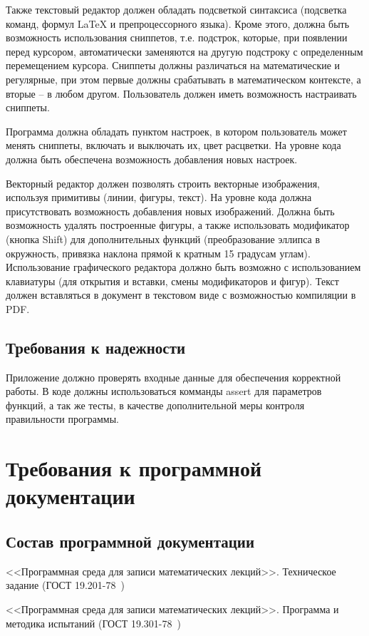 \documentclass[testmethods]{espd}
\begin{document}
Также текстовый редактор должен обладать подсветкой синтаксиса (подсветка команд, формул LaTeX и препроцессорного языка). Кроме этого, должна быть возможность использования сниппетов, т.е. подстрок, которые, при появлении перед курсором, автоматически заменяются на другую подстроку с определенным перемещением курсора. Сниппеты должны различаться на математические и регулярные, при этом первые должны срабатывать в математическом контексте, а вторые -- в любом другом. Пользователь должен иметь возможность настраивать сниппеты.

Программа должна обладать пунктом настроек, в котором пользователь может менять сниппеты, включать и выключать их, цвет расцветки. На уровне кода должна быть обеспечена возможность добавления новых настроек.

Векторный редактор должен позволять строить векторные изображения, используя примитивы (линии, фигуры, текст). На уровне кода должна присутствовать возможность добавления новых изображений. Должна быть возможность удалять построенные фигуры, а также использовать модификатор (кнопка Shift) для дополнительных функций (преобразование эллипса в окружность, привязка наклона прямой к кратным 15 градусам углам). Использование графического редактора должно быть возможно с использованием клавиатуры (для открытия и вставки, смены модификаторов и фигур). Текст должен вставляться в документ в текстовом виде с возможностью компиляции в PDF.

\subsection{Требования к надежности}
Приложение должно проверять входные данные для обеспечения корректной работы. В коде должны использоваться комманды assert для параметров функций, а так же тесты, в качестве дополнительной меры контроля правильности программы.

\section{Требования к программной документации}
\subsection{Состав программной документации}\label{subsection:documentation}
<<Программная среда для записи математических лекций>>. Техническое задание (ГОСТ 19.201-78~\cite{espd201})

<<Программная среда для записи математических лекций>>. Программа и методика испытаний (ГОСТ 19.301-78~\cite{espd301})
\end{document}
